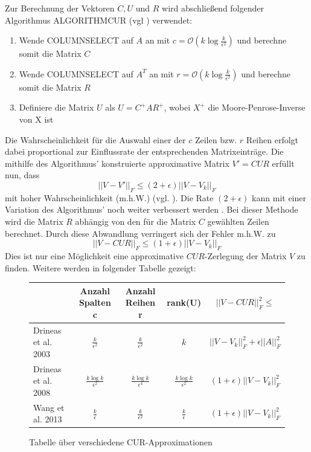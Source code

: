 \documentclass[12pt,a4paper,twoside]{article}
\begin{document}
		Zur Berechnung der Vektoren $C,U$ und $R$ wird abschließend folgender Algorithmus ALGORITHMCUR (vgl \citep{mahoney2008}) verwendet:
		\begin{enumerate}
			\item Wende COLUMNSELECT auf $A$ an mit $c=\mathcal{O}(k \log \frac{k}{\epsilon^2})$ und berechne somit die Matrix $C$
			\item Wende COLUMNSELECT auf $A^T$ an mit $r=\mathcal{O}(k \log \frac{k}{\epsilon^2})$ und berechne somit die Matrix $R$
			\item Definiere die Matrix $U$ als $U=C^+AR^+$, wobei $X^+$ die Moore-Penrose-Inverse \citep{penrose1955} von X ist
		\end{enumerate}
		Die Wahrscheinlichkeit für die Auswahl einer der $c$ Zeilen bzw. $r$ Reihen erfolgt dabei proportional zur Einflussrate der entsprechenden Matrixeinträge. \newline
		\newline
		Die mithilfe des Algorithmus' konstruierte approximative Matrix $V'=CUR$ erfüllt nun, dass
		\begin{equation*}
			||V-V'||_F\leq (2+\epsilon )||V-V_k||_F
		\end{equation*}		
		mit hoher Wahrscheinlichkeit (m.h.W.) (vgl. \citep{mahoney2008}). \newline
		\newline
		Die Rate $(2+\epsilon)$ kann mit einer Variation des Algorithmus' noch weiter verbessert werden \citep{Drineas2009}. Bei dieser Methode wird die Matrix $R$ abhängig von den für die Matrix $C$ gewählten Zeilen berechnet. Durch diese Abwandlung verringert sich der Fehler m.h.W. zu
		\begin{equation*}
			||V-CUR||_F\leq (1+\epsilon)||V-V_k||_F
		\end{equation*}
		Dies ist nur eine Möglichkeit eine approximative $CUR$-Zerlegung der Matrix $V$ zu finden. Weitere werden in 
		folgender Tabelle gezeigt: \newline
		\begin{figure}[h]
			\begin{tabular}{l||c|c|c|c}
		 		& Anzahl Spalten c & Anzahl Reihen r & rank(U) & $||V-CUR||_F^2\leq$ \\
		 		\hline \hline
		 		Drineas et al. 2003 \citep{drineas2003} & $\frac{k}{\epsilon^2}$ & $\frac{k}{\epsilon^2}$ & $k$ & $||V-V_k||_F^2+\epsilon||A||^2_F$ \\
		 		\hline
		 		Drineas et al. 2008 \citep{Drineas2009} & $\frac{k\log k}{\epsilon^2}$ & $\frac{k\log k}{\epsilon^4}$ & $\frac{k\log k}{\epsilon^2}$ & $(1+\epsilon)||V-V_k||^2_F$ \\
		 		\hline
		 		Wang et al. 2013 \citep{Wang2013}& $\frac{k}{\epsilon}$ & $\frac{k}{\epsilon^2}$ & $\frac{k}{\epsilon}$ & $(1+\epsilon)||V-V_k||^2_F$
			\end{tabular}
			\caption{Tabelle über verschiedene CUR-Approximationen}
		\end{figure}
		
\end{document}

